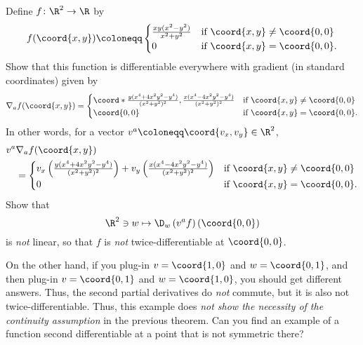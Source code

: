 \begin{exr}{}{}
Define $f\colon \R ^2\rightarrow \R$ by
\begin{equation}
f(\coord{x,y})\coloneqq \begin{cases}\frac{xy(x^2-y^2)}{x^2+y^2} & \text{if }\coord{x,y}\neq \coord{0,0} \\ 0 & \text{if }\coord{x,y}=\coord{0,0}.\end{cases}
\end{equation}
Show that this function is differentiable everywhere with gradient (in standard coordinates) given by
{\scriptsize
\begin{equation*}
\nabla _af(\coord{x,y})=\begin{cases}\coord*{\frac{y(x^4+4x^2y^2-y^4)}{(x^2+y^2)^2},\frac{x(x^4-4x^2y^2-y^4)}{(x^2+y^2)^2}} & \text{if }\coord{x,y}\neq \coord{0,0} \\ \coord{0,0} & \text{if }\coord{x,y}=\coord{0,0}.\end{cases}
\end{equation*}
}
In other words, for a vector $v^a\coloneqq \coord{v_x,v_y}\in \R ^2$,
{\tiny
\begin{equation*}
\begin{split}
& v^a\nabla _af(\coord{x,y}) \\
& \quad =\begin{cases}v_x\left(\frac{y(x^4+4x^2y^2-y^4)}{(x^2+y^2)^2} \right) +v_y\left( \frac{x(x^4-4x^2y^2-y^4)}{(x^2+y^2)^2}\right) & \text{if }\coord{x,y}\neq \coord{0,0} \\ 0 & \text{if }\coord{x,y}=\coord{0,0}.\end{cases}
\end{split}
\end{equation*}
}
Show that
\begin{equation}
\R ^2\ni w\mapsto \D _w\left( v^af\right) (\coord{0,0})
\end{equation}
is \emph{not} linear, so that $f$ is \emph{not} twice-differentiable at $\coord{0,0}$.
\begin{rmk}
On the other hand, if you plug-in $v=\coord{1,0}$ and $w=\coord{0,1}$, and then plug-in $v=\coord{0,1}$ and $w=\coord{1,0}$, you should get different answers.  Thus, the second partial derivatives do \emph{not} commute, but it is also not twice-differentiable.  Thus, this example does \emph{not show the necessity of the continuity assumption} in the previous theorem.  Can you find an example of a function second differentiable at a point that is not symmetric there?
\end{rmk}
\end{exr}
